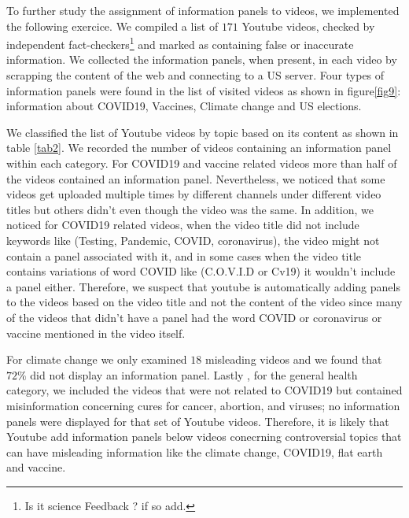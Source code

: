 \documentclass{article}
\begin{document}
To further study the assignment of information panels to videos, we implemented the following exercice. We compiled a list of $171$ Youtube videos, checked by independent fact-checkers\footnote{Is it science Feedback ? if so add.} and marked as containing false or inaccurate information. We collected the information panels, when present, in each video by scrapping the content of the web and connecting to a US server. Four types of information panels were found in the list of visited videos as shown in figure\ref{fig9}:  information about COVID19, Vaccines, Climate change and US elections.

We classified the list of Youtube videos by topic based on its content as shown in table \ref{tab2}. We recorded the number of videos containing an information panel within each category. For COVID19 and vaccine related videos more than half of the videos contained an information panel. {\color{pink} Nevertheless, we noticed that some videos get uploaded multiple times by different channels under different video titles but others didn’t even though the video was the same.} In addition, we noticed for COVID19 related videos, when the video title did not include keywords like (Testing, Pandemic, COVID, coronavirus), the video might not contain a panel associated with it, and in some cases when the video title contains variations of word COVID like (C.O.V.I.D or Cv19) it wouldn’t include a panel either. Therefore, we suspect that youtube is automatically adding panels to the videos based on the video title and not the content of the video since many of the videos that didn’t have a panel had the word COVID or coronavirus or vaccine mentioned in the video itself. 

\smallskip

For climate change we only examined $18$ misleading videos and we found that $72\%$ did not display an information panel. Lastly , for the general health category, we included the videos that were not related to COVID19 but contained misinformation concerning cures for cancer, abortion,  and viruses; no information panels were displayed for that set of Youtube videos. Therefore, it is likely that Youtube add information panels below videos conecrning controversial topics that can have misleading information like the climate change, COVID19, flat earth and  vaccine. 
\end{document}
